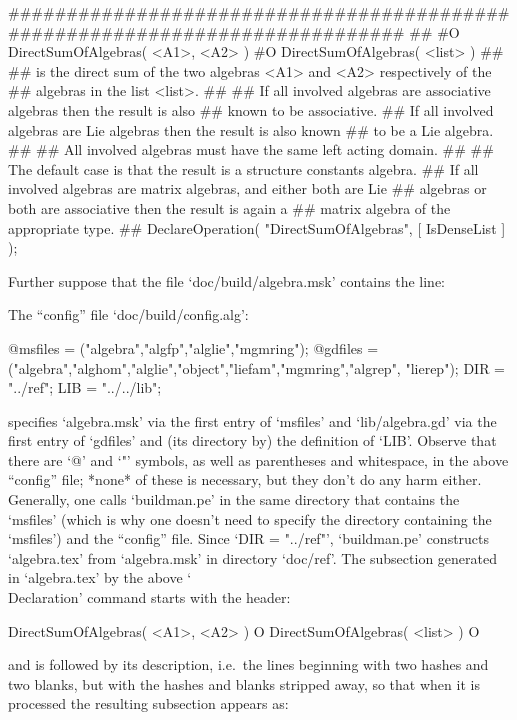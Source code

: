 \begintt
#############################################################################
##
#O  DirectSumOfAlgebras( <A1>, <A2> )
#O  DirectSumOfAlgebras( <list> )
##
##  is the direct sum of the two algebras <A1> and <A2> respectively of the
##  algebras in the list <list>.
##
##  If all involved algebras are associative algebras then the result is also
##  known to be associative.
##  If all involved algebras are Lie algebras then the result is also known
##  to be a Lie algebra.
##
##  All involved algebras must have the same left acting domain.
##
##  The default case is that the result is a structure constants algebra.
##  If all involved algebras are matrix algebras, and either both are Lie
##  algebras or both are associative then the result is again a
##  matrix algebra of the appropriate type.
##
DeclareOperation( "DirectSumOfAlgebras", [ IsDenseList ] );
\endtt

Further suppose that the file `doc/build/algebra.msk' contains the line:

\begintt
{}
\endtt

The ``config'' file `doc/build/config.alg':

\begintt
@msfiles = ("algebra","algfp","alglie","mgmring");
@gdfiles = ("algebra","alghom","alglie","object","liefam","mgmring","algrep",
            "lierep");
DIR = "../ref";
LIB = "../../lib";
\endtt

specifies  `algebra.msk'  via  the   first   entry   of   `msfiles'   and
`lib/algebra.gd' via the first entry of `gdfiles' and (its directory  by)
the definition of `LIB'. Observe that there are `@' and `"'  symbols,  as
well as parentheses and whitespace, in the above ``config'' file;  *none*
of these is necessary, but they don't do any harm either. Generally,  one
calls `buildman.pe' in the same directory  that  contains  the  `msfiles'
(which is why one doesn't need to specify the  directory  containing  the
`msfiles') and the ``config'' file. Since `DIR = "../ref"', `buildman.pe'
constructs `algebra.tex' from `algebra.msk' in directory  `doc/ref'.  The
subsection  generated  in  `algebra.tex'  by  the  above  `\\Declaration'
command starts with the header:

\begintt
\>DirectSumOfAlgebras( <A1>, <A2> ) O
\>DirectSumOfAlgebras( <list> ) O
\endtt

and is followed by its description, i.e.~the  lines  beginning  with  two
hashes and two blanks, but with the hashes and blanks stripped  away,  so
that when it is processed the resulting subsection appears as:

